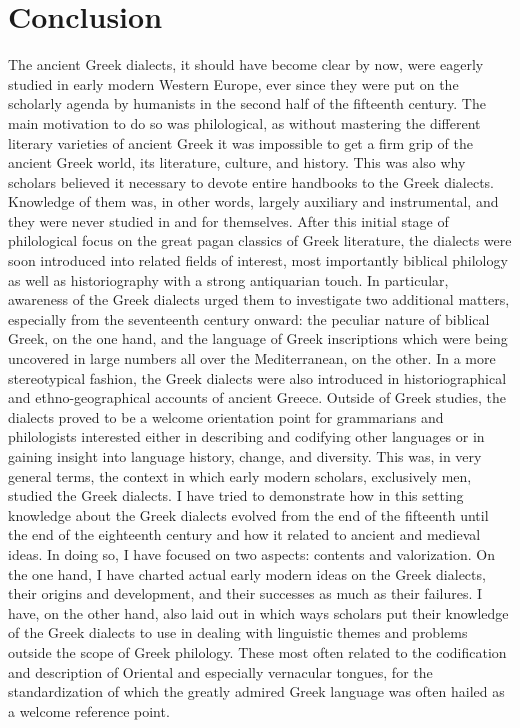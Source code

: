 \documentclass[output=paper]{langsci/langscibook}
\begin{document}
\section{Conclusion} %
\hypertarget{Toc19704869}{}
The ancient Greek dialects, it should have become clear by now, were eagerly studied in early modern Western Europe, ever since they were put on the scholarly agenda by humanists in the second half of the fifteenth century. The main motivation to do so was philological, as without mastering the different literary varieties of ancient Greek it was impossible to get a firm grip of the ancient Greek world, its literature, culture, and history. This was also why scholars believed it necessary to devote entire handbooks to the Greek dialects. Knowledge of them was, in other words, largely auxiliary and instrumental, and they were never studied in and for themselves. After this initial stage of philological focus on the great pagan classics of Greek literature, the dialects were soon introduced into related fields of interest, most importantly biblical philology as well as historiography with a strong antiquarian touch. In particular, awareness of the Greek dialects urged them to investigate two additional matters, especially from the seventeenth century onward: the peculiar nature of biblical Greek, on the one hand, and the language of Greek inscriptions which were being uncovered in large numbers all over the Mediterranean, on the other. In a more stereotypical fashion, the Greek dialects were also introduced in historiographical and ethno-geographical accounts of ancient Greece. Outside of Greek studies, the dialects proved to be a welcome orientation point for grammarians and philologists interested either in describing and codifying other languages or in gaining insight into language history, change, and diversity. This was, in very general terms, the context in which early modern scholars, exclusively men, studied the Greek dialects. I have tried to demonstrate how in this setting knowledge about the Greek dialects evolved from the end of the fifteenth until the end of the eighteenth century and how it related to ancient and medieval ideas. In doing so, I have focused on two aspects: contents and valorization. On the one hand, I have charted actual early modern ideas on the Greek dialects, their origins and development, and their successes as much as their failures. I have, on the other hand, also laid out in which ways scholars put their knowledge of the Greek dialects to use in dealing with linguistic themes and problems outside the scope of Greek philology. These most often related to the codification and description of Oriental and especially vernacular tongues, for the standardization of which the greatly admired Greek language was often hailed as a welcome reference point.
\end{document}
